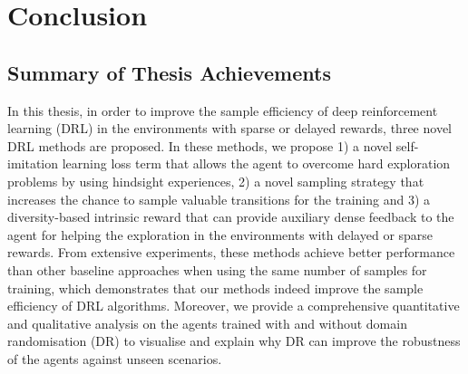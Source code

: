 \chapter{Conclusion}

\label{ch:conclusions}

\section{Summary of Thesis Achievements}
In this thesis, in order to improve the sample efficiency of deep reinforcement learning (DRL) in the environments with sparse or delayed rewards, three novel DRL methods are proposed. In these methods, we propose 1) a novel self-imitation learning loss term that allows the agent to overcome hard exploration problems by using hindsight experiences, 2) a novel sampling strategy that increases the chance to sample valuable transitions for the training and 3) a diversity-based intrinsic reward that can provide auxiliary dense feedback to the agent for helping the exploration in the environments with delayed or sparse rewards. From extensive experiments, these methods achieve better performance than other baseline approaches when using the same number of samples for training, which demonstrates that our methods indeed improve the sample efficiency of DRL algorithms. Moreover, we provide a comprehensive quantitative and qualitative analysis on the agents trained with and without domain randomisation (DR) to visualise and explain why DR can improve the robustness of the agents against unseen scenarios.

